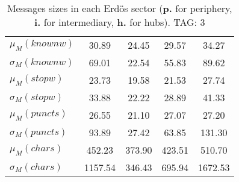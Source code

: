 \begin{table}[h!]
\begin{center}
\begin{tabular}{| l || c | c | c | c |}
$\mu_M(knownw)$ & 30.89  & 24.45  & 29.57  & 34.27 \\
$\sigma_M(knownw)$ & 69.01  & 22.54  & 55.83  & 89.62 \\\hline
$\mu_M(stopw)$ & 23.73  & 19.58  & 21.53  & 27.74 \\
$\sigma_M(stopw)$ & 33.88  & 22.22  & 28.89  & 41.33 \\\hline
$\mu_M(puncts)$ & 26.55  & 21.10  & 27.07  & 27.20 \\
$\sigma_M(puncts)$ & 93.89  & 27.42  & 63.85  & 131.30 \\\hline
$\mu_M(chars)$ & 452.23  & 373.90  & 423.51  & 510.70 \\
$\sigma_M(chars)$ & 1157.54  & 346.43  & 695.94  & 1672.53 \\\hline
\end{tabular}
\caption{Messages sizes in each Erd\"os sector ({{\bf p.}} for periphery, {{\bf i.}} for intermediary, {{\bf h.}} for hubs). TAG: 3}
\end{center}
\end{table}